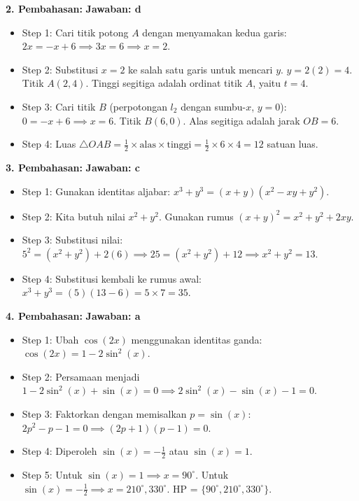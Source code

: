 \documentclass[12pt,a4paper]{article}
\begin{document}
\textbf{2. Pembahasan:} \hfill \textbf{Jawaban: d}
\begin{itemize}
    \item Step 1: Cari titik potong $A$ dengan menyamakan kedua garis: $2x = -x + 6 \implies 3x = 6 \implies x = 2$.
    \item Step 2: Substitusi $x=2$ ke salah satu garis untuk mencari $y$. $y = 2(2) = 4$. Titik $A(2, 4)$. Tinggi segitiga adalah ordinat titik $A$, yaitu $t = 4$.
    \item Step 3: Cari titik $B$ (perpotongan $l_2$ dengan sumbu-$x$, $y=0$): $0 = -x + 6 \implies x = 6$. Titik $B(6,0)$. Alas segitiga adalah jarak $OB = 6$.
    \item Step 4: Luas $\triangle OAB = \frac{1}{2} \times \text{alas} \times \text{tinggi} = \frac{1}{2} \times 6 \times 4 = 12$ satuan luas.
\end{itemize}

\textbf{3. Pembahasan:} \hfill \textbf{Jawaban: c}
\begin{itemize}
    \item Step 1: Gunakan identitas aljabar: $x^3 + y^3 = (x + y)(x^2 - xy + y^2)$.
    \item Step 2: Kita butuh nilai $x^2 + y^2$. Gunakan rumus $(x + y)^2 = x^2 + y^2 + 2xy$.
    \item Step 3: Substitusi nilai: $5^2 = (x^2 + y^2) + 2(6) \implies 25 = (x^2 + y^2) + 12 \implies x^2 + y^2 = 13$.
    \item Step 4: Substitusi kembali ke rumus awal: $x^3 + y^3 = (5)(13 - 6) = 5 \times 7 = 35$.
\end{itemize}

\textbf{4. Pembahasan:} \hfill \textbf{Jawaban: a}
\begin{itemize}
    \item Step 1: Ubah $\cos(2x)$ menggunakan identitas ganda: $\cos(2x) = 1 - 2\sin^2(x)$.
    \item Step 2: Persamaan menjadi $1 - 2\sin^2(x) + \sin(x) = 0 \implies 2\sin^2(x) - \sin(x) - 1 = 0$.
    \item Step 3: Faktorkan dengan memisalkan $p = \sin(x)$: $2p^2 - p - 1 = 0 \implies (2p + 1)(p - 1) = 0$.
    \item Step 4: Diperoleh $\sin(x) = -\frac{1}{2}$ atau $\sin(x) = 1$.
    \item Step 5: Untuk $\sin(x) = 1 \implies x = 90^\circ$. Untuk $\sin(x) = -\frac{1}{2} \implies x = 210^\circ, 330^\circ$. HP = $\{90^\circ, 210^\circ, 330^\circ\}$.
\end{itemize}
\end{document}

